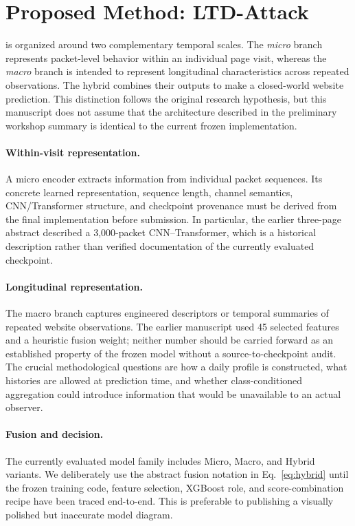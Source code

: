\section{Proposed Method: LTD-Attack}\label{sec:method}
\LTD{} is organized around two complementary temporal scales. The \emph{micro} branch represents packet-level behavior within an individual page visit, whereas the \emph{macro} branch is intended to represent longitudinal characteristics across repeated observations. The hybrid combines their outputs to make a closed-world website prediction. This distinction follows the original research hypothesis, but this manuscript does not assume that the architecture described in the preliminary workshop summary is identical to the current frozen implementation.

\paragraph{Within-visit representation.} A micro encoder extracts information from individual packet sequences. Its concrete learned representation, sequence length, channel semantics, CNN/Transformer structure, and checkpoint provenance must be derived from the final implementation before submission. In particular, the earlier three-page abstract described a 3,000-packet CNN--Transformer, which is a historical description rather than verified documentation of the currently evaluated checkpoint.

\paragraph{Longitudinal representation.} The macro branch captures engineered descriptors or temporal summaries of repeated website observations. The earlier manuscript used 45 selected features and a heuristic fusion weight; neither number should be carried forward as an established property of the frozen model without a source-to-checkpoint audit. The crucial methodological questions are how a daily profile is constructed, what histories are allowed at prediction time, and whether class-conditioned aggregation could introduce information that would be unavailable to an actual observer.

\paragraph{Fusion and decision.} The currently evaluated model family includes Micro, Macro, and Hybrid variants. We deliberately use the abstract fusion notation in Eq.~\eqref{eq:hybrid} until the frozen training code, feature selection, XGBoost role, and score-combination recipe have been traced end-to-end. This is preferable to publishing a visually polished but inaccurate model diagram.

